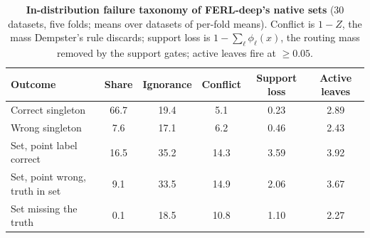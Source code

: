 \begin{table}[t]
\centering
\footnotesize
\setlength{\tabcolsep}{3pt}
\caption{\textbf{In-distribution failure taxonomy of FERL-deep's native sets} (30 datasets, five folds; means over datasets of per-fold means). Conflict is $1-Z$, the mass Dempster's rule discards; support loss is $1-\sum_\ell\phi_\ell(x)$, the routing mass removed by the support gates; active leaves fire at $\ge 0.05$.}
\label{tab:taxonomy}
\begin{tabular}{@{}lccccc@{}}
\toprule
Outcome & Share & Ignorance & Conflict & Support loss & Active leaves\\
\midrule
Correct singleton & 66.7 & 19.4 & 5.1 & 0.23 & 2.89\\
Wrong singleton & 7.6 & 17.1 & 6.2 & 0.46 & 2.43\\
Set, point label correct & 16.5 & 35.2 & 14.3 & 3.59 & 3.92\\
Set, point wrong, truth in set & 9.1 & 33.5 & 14.9 & 2.06 & 3.67\\
Set missing the truth & 0.1 & 18.5 & 10.8 & 1.10 & 2.27\\
\bottomrule
\end{tabular}
\end{table}

